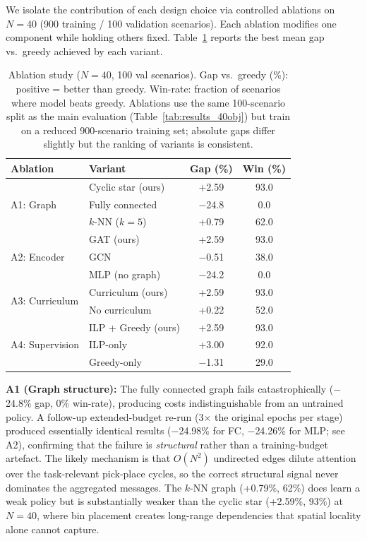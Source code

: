 \documentclass[conference]{IEEEtran}
\begin{document}
We isolate the contribution of each design choice via controlled ablations on $N{=}40$ (900 training / 100 validation scenarios). Each ablation modifies one component while holding others fixed. Table~\ref{tab:ablations} reports the best mean gap vs.\ greedy achieved by each variant.

\begin{table}[htbp]
\caption{Ablation study ($N{=}40$, 100 val scenarios). Gap vs.\ greedy (\%): positive = better than greedy. Win-rate: fraction of scenarios where model beats greedy. Ablations use the same 100-scenario split as the main evaluation (Table~\ref{tab:results_40obj}) but train on a reduced 900-scenario training set; absolute gaps differ slightly but the ranking of variants is consistent.}
\label{tab:ablations}
\centering
\begin{tabular}{@{}llcc@{}}
\toprule
\textbf{Ablation} & \textbf{Variant} & \textbf{Gap (\%)} & \textbf{Win (\%)} \\
\midrule
\multirow{3}{*}{A1: Graph}
    & Cyclic star (ours) & +2.59 & 93.0 \\
    & Fully connected & $-$24.8 & 0.0 \\
    & $k$-NN ($k{=}5$) & +0.79 & 62.0 \\
\cmidrule(l){2-4}
\multirow{3}{*}{A2: Encoder}
    & GAT (ours) & +2.59 & 93.0 \\
    & GCN & $-$0.51 & 38.0 \\
    & MLP (no graph) & $-$24.2 & 0.0 \\
\cmidrule(l){2-4}
\multirow{2}{*}{A3: Curriculum}
    & Curriculum (ours) & +2.59 & 93.0 \\
    & No curriculum & +0.22 & 52.0 \\
\cmidrule(l){2-4}
\multirow{3}{*}{A4: Supervision}
    & ILP + Greedy (ours) & +2.59 & 93.0 \\
    & ILP-only & +3.00 & 92.0 \\
    & Greedy-only & $-$1.31 & 29.0 \\
\bottomrule
\end{tabular}
\end{table}

\textbf{A1 (Graph structure):} The fully connected graph fails catastrophically ($-$24.8\% gap, 0\% win-rate), producing costs indistinguishable from an untrained policy. A follow-up extended-budget re-run (3$\times$ the original epochs per stage) produced essentially identical results ($-$24.98\% for FC, $-$24.26\% for MLP; see A2), confirming that the failure is \emph{structural} rather than a training-budget artefact. The likely mechanism is that $O(N^2)$ undirected edges dilute attention over the task-relevant pick-place cycles, so the correct structural signal never dominates the aggregated messages. The $k$-NN graph (+0.79\%, 62\%) does learn a weak policy but is substantially weaker than the cyclic star (+2.59\%, 93\%) at $N{=}40$, where bin placement creates long-range dependencies that spatial locality alone cannot capture.
\end{document}
